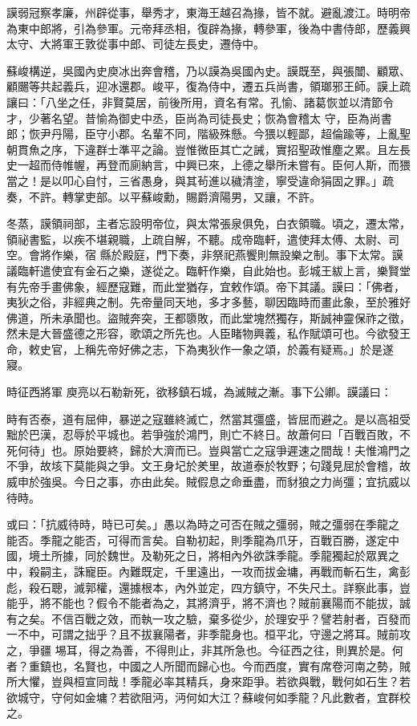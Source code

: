 \begin{pinyinscope}
 謨弱冠察孝廉，州辟從事，舉秀才，東海王越召為掾，皆不就。避亂渡江。時明帝為東中郎將，引為參軍。元帝拜丞相，復辟為掾，轉參軍，後為中書侍郎，歷義興太守、大將軍王敦從事中郎、司徒左長史，遷侍中。



 蘇峻構逆，吳國內史庾冰出奔會稽，乃以謨為吳國內史。謨既至，與張闓、顧眾、顧颺等共起義兵，迎冰還郡。峻平，復為侍中，遷五兵尚書，領瑯邪王師。謨上疏讓曰：「八坐之任，非賢莫居，前後所用，資名有常。孔愉、諸葛恢並以清節令才，少著名望。昔愉為御史中丞，臣尚為司徒長史；恢為會稽太
 守，臣為尚書郎；恢尹丹陽，臣守小郡。名輩不同，階級殊懸。今猥以輕鄙，超倫踰等，上亂聖朝貫魚之序，下違群士準平之論。豈惟微臣其亡之誡，實招聖政惟塵之累。且左長史一超而侍帷幄，再登而廁納言，中興已來，上德之舉所未嘗有。臣何人斯，而猥當之！是以叩心自忖，三省愚身，與其茍進以穢清塗，寧受違命狷固之罪。」疏奏，不許。轉掌吏部。以平蘇峻勳，賜爵濟陽男，又讓，不許。



 冬蒸，謨領祠部，主者忘設明帝位，與太常張泉俱免，白衣領職。頃之，遷太常，領祕書監，以疾不堪親職，上疏自解，不聽。成帝臨軒，遣使拜太傅、太尉、司空。會將作樂，宿
 縣於殿庭，門下奏，非祭祀燕饗則無設樂之制。事下太常。謨議臨軒遣使宜有金石之樂，遂從之。臨軒作樂，自此始也。彭城王紱上言，樂賢堂有先帝手畫佛象，經歷寇難，而此堂猶存，宜敕作頌。帝下其議。謨曰：「佛者，夷狄之俗，非經典之制。先帝量同天地，多才多藝，聊因臨時而畫此象，至於雅好佛道，所未承聞也。盜賊奔突，王都隳敗，而此堂塊然獨存，斯誠神靈保祚之徵，然未是大晉盛德之形容，歌頌之所先也。人臣睹物興義，私作賦頌可也。今欲發王命，敕史官，上稱先帝好佛之志，下為夷狄作一象之頌，於義有疑焉。」於是遂寢。



 時征西將軍
 庾亮以石勒新死，欲移鎮石城，為滅賊之漸。事下公卿。謨議曰：



 時有否泰，道有屈伸，暴逆之寇雖終滅亡，然當其彊盛，皆屈而避之。是以高祖受黜於巴漢，忍辱於平城也。若爭強於鴻門，則亡不終日。故蕭何曰「百戰百敗，不死何待」也。原始要終，歸於大濟而已。豈與當亡之寇爭遲速之間哉！夫惟鴻門之不爭，故垓下莫能與之爭。文王身圮於羑里，故道泰於牧野；句踐見屈於會稽，故威申於強吳。今日之事，亦由此矣。賊假息之命垂盡，而豺狼之力尚彊；宜抗威以待時。



 或曰：「抗威待時，時已可矣。」愚以為時之可否在賊之彊弱，賊之彊弱在季龍之
 能否。季龍之能否，可得而言矣。自勒初起，則季龍為爪牙，百戰百勝，遂定中國，境土所據，同於魏世。及勒死之日，將相內外欲誅季龍。季龍獨起於眾異之中，殺嗣主，誅寵臣。內難既定，千里遠出，一攻而拔金墉，再戰而斬石生，禽彭彪，殺石聰，滅郭權，還據根本，內外並定，四方鎮守，不失尺土。詳察此事，豈能乎，將不能也？假令不能者為之，其將濟乎，將不濟也？賊前襄陽而不能拔，誠有之矣。不信百戰之效，而執一攻之驗，棄多從少，於理安乎？譬若射者，百發而一不中，可謂之拙乎？且不拔襄陽者，非季龍身也。桓平北，守邊之將耳。賊前攻之，爭疆
 埸耳，得之為善，不得則止，非其所急也。今征西之往，則異於是。何者？重鎮也，名賢也，中國之人所聞而歸心也。今而西度，實有席卷河南之勢，賊所大懼，豈與桓宣同哉！季龍必率其精兵，身來距爭。若欲與戰，戰何如石生？若欲城守，守何如金墉？若欲阻沔，沔何如大江？蘇峻何如季龍？凡此數者，宜群校之。




\end{pinyinscope}
